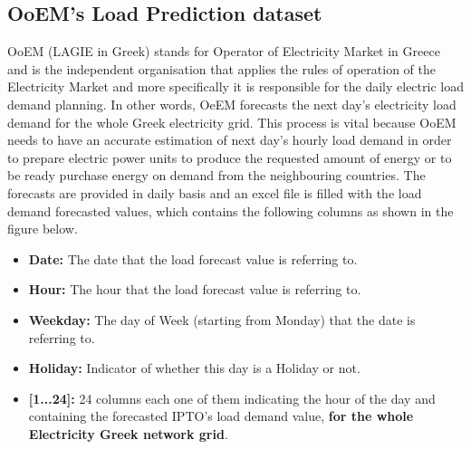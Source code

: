 \subsection{OoEM's Load Prediction dataset}
OoEM (LAGIE in Greek) stands for Operator of Electricity Market in Greece and is the independent organisation that applies the rules of operation of the Electricity Market and more specifically it is responsible for the daily electric load demand planning. In other words, OeEM forecasts the next day's electricity load demand for the whole Greek electricity grid. This process is vital because OoEM needs to have an accurate estimation of next day's hourly load demand in order to prepare electric power units to produce the requested amount of energy or to be ready purchase energy on demand from the neighbouring countries. The forecasts are provided in daily basis and an excel file is filled with the load demand forecasted values, which contains the following columns as shown in the figure below.
\begin{itemize}
    \item \textbf{Date:} The date that the load forecast value is referring to.
    \item \textbf{Hour:} The hour that the load forecast value is referring to.
    \item \textbf{Weekday:} The day of Week (starting from Monday) that the date is referring to.
    \item \textbf{Holiday:} Indicator of whether this day is a Holiday or not.
    \item \textbf{[1...24]:} 24 columns each one of them indicating the hour of the day and containing the forecasted IPTO's load demand value, \textbf{for the whole Electricity Greek network grid}.
\end{itemize}

